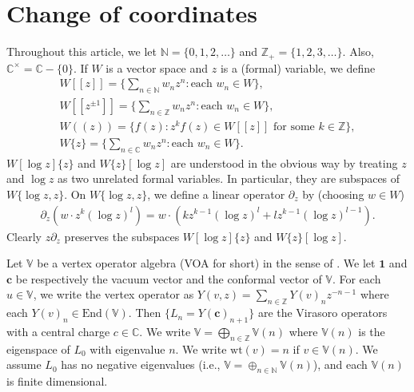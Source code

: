 \documentclass[11pt,b5paper,notitlepage]{article}
\theoremstyle{definition}
\theoremstyle{plain}
\newcommand{\End}{\mathrm{End}} %
\newcommand{\id}{\mathbf{1}}
\newcommand{\mbb}{\mathbb}
\newcommand{\Vbb}{\mathbb V}
\newcommand{\Cbb}{\mathbb C}
\newcommand{\Nbb}{\mathbb N}
\newcommand{\Zbb}{\mathbb Z}
\newcommand{\cbf}{\mathbf c}
\newcommand{\wt}{\mathrm{wt}}
\numberwithin{equation}{section}
\begin{document}
\section{Change of coordinates}\label{lb58}

Throughout this article, we let $\Nbb=\{0,1,2,\dots\}$ and $\Zbb_+=\{1,2,3,\dots\}$. Also, $\Cbb^\times=\Cbb-\{0\}$. If $W$ is a vector space and $z$ is a (formal) variable, we  define 
\begin{gather*}
W[[z]]=\bigg\{\sum_{n\in\mathbb N}w_nz^n:\text{each }w_n\in W\bigg\},\\
W[[z^{\pm 1}]]=\bigg\{\sum_{n\in\mathbb Z}w_nz^n:\text{each }w_n\in W\bigg\},\\
W((z))=\Big\{f(z):z^kf(z)\in W[[z]]\text{ for some }k\in\mbb Z \Big\},\\
W\{z\}=\Big\{\sum_{n\in\mbb C}w_nz^n :\text{each $w_n\in W$}\Big\}.
\end{gather*}
$W[\log z]\{z\}$ and $W\{z\}[\log z]$ are understood in the obvious way by treating  $z$ and $\log z$ as two unrelated formal variables. In particular, they are subspaces of $W\{\log z,z\}$. On   $W\{\log z,z\}$, we define a linear operator $\partial_z$ by (choosing $w\in W$)
\begin{align}
\partial_z(w\cdot z^k(\log z)^l)=w\cdot(kz^{k-1}(\log z)^l+lz^{k-1}(\log z)^{l-1}). \label{eq101}	
\end{align}
Clearly $z\partial_z$ preserves the subspaces $W[\log z]\{z\}$ and $W\{z\}[\log z]$.

Let $\Vbb$ be a vertex operator algebra (VOA for short) in the sense of \cite{FHL93}. We let $\id$ \index{1@$\id$} and $\cbf$ \index{c@$\cbf$} be respectively the vacuum vector and the conformal vector of $\Vbb$. For each $u\in\Vbb$, we write the vertex operator as $Y(v,z)=\sum_{n\in\Zbb}Y(v)_nz^{-n-1}$ where each $Y(v)_n\in\End(\Vbb)$. Then $\{L_n=Y(\cbf)_{n+1} \}$ are the Virasoro operators with a central charge  $c\in\Cbb$. We write $\Vbb=\bigoplus_{n\in\Zbb}\Vbb(n)$ where $\Vbb(n)$ is the eigenspace of $L_0$ with eigenvalue $n$. We write $\wt(v)=n$ if $v\in\Vbb(n)$. We assume $L_0$ has no negative eigenvalues (i.e., $\Vbb=\oplus_{n\in\Nbb}\Vbb(n)$), and each $\Vbb(n)$ is finite dimensional.
\end{document}
